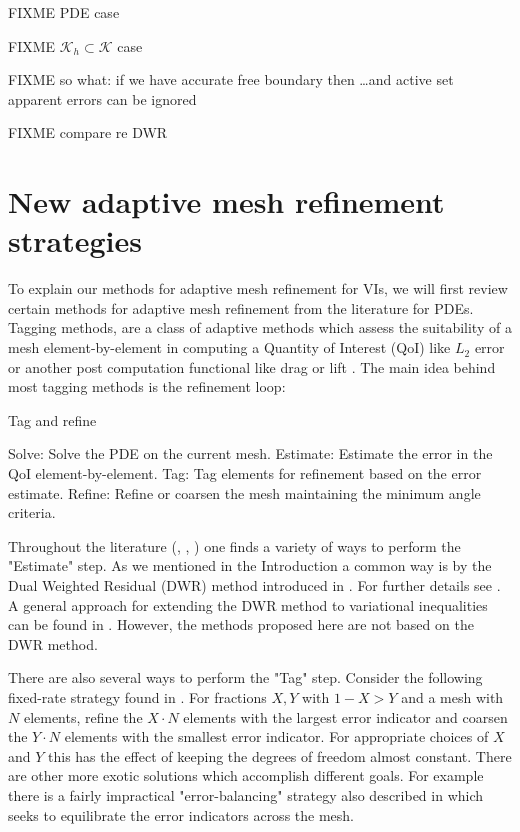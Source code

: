\documentclass[]{interact}
\theoremstyle{plain}%
\theoremstyle{definition}
\theoremstyle{remark}
\newcommand{\cK}{\mathcal{K}}
\begin{document}
FIXME PDE case

FIXME $\cK_h\subset \cK$ case

FIXME so what: if we have accurate free boundary then \dots and active set apparent errors can be ignored

FIXME compare \cite{Suttmeier2008} re DWR


\section{New adaptive mesh refinement strategies} \label{sec:viamr}

To explain our methods for adaptive mesh refinement for VIs, we will first review certain methods for adaptive mesh refinement from the literature for PDEs.  Tagging methods, are a class of adaptive methods which assess the suitability of a mesh element-by-element in computing a Quantity of Interest (QoI) like $L_2$ error or another post computation functional like drag or lift \cite{bangerth_adaptive_2003}. The main idea behind most tagging methods is the refinement loop:

\begin{algorithm}
  \caption{Tag and refine}
  \begin{algorithmic}
    \State Solve: Solve the PDE on the current mesh. 
    \State Estimate: Estimate the error in the QoI element-by-element.
    \State Tag: Tag elements for refinement based on the error estimate.
    \State Refine: Refine or coarsen the mesh maintaining the minimum angle criteria.
  \end{algorithmic}
\end{algorithm}

Throughout the literature (\citet{becker_feed-back_1996}, \citet{bangerth_adaptive_2003}, \citet{suttmeier_numerical_2008}) one finds a variety of ways to perform the "Estimate" step. As we mentioned in the Introduction a common way is by the Dual Weighted Residual (DWR) method introduced in \citet{becker_feed-back_1996}. For further details see \citet[Chapter 3]{bangerth_adaptive_2003}. A general approach for extending the DWR method to variational inequalities can be found in \citet{suttmeier_numerical_2008}.  However, the methods proposed here are not based on the DWR method. 

There are also several ways to perform the "Tag" step. Consider the following fixed-rate strategy found in \citet[Chapter 4]{bangerth_adaptive_2003}. For fractions $X, Y$ with $1 - X > Y$ and a mesh with $N$ elements, refine the $X\cdot N$ elements with the largest error indicator and coarsen the $Y\cdot N$ elements with the smallest error indicator. For appropriate choices of $X$ and $Y$ this has the effect of keeping the degrees of freedom almost constant. There are other more exotic solutions which accomplish different goals. For example there is a fairly impractical "error-balancing" strategy also described in \citet[Chapter 4]{bangerth_adaptive_2003} which seeks to equilibrate the error indicators across the mesh.
\end{document}
